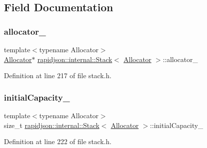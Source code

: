 \subsection{Field Documentation}
\mbox{\label{classrapidjson_1_1internal_1_1_stack_af1b187bea41f9e60e96e0a535c489ae2}} 
\subsubsection{\texorpdfstring{allocator\_}{allocator\_}}
{\footnotesize\ttfamily template$<$typename Allocator$>$ \\
\mbox{\hyperlink{classrapidjson_1_1_allocator}{Allocator}}$\ast$ \mbox{\hyperlink{classrapidjson_1_1internal_1_1_stack}{rapidjson\+::internal\+::\+Stack}}$<$ \mbox{\hyperlink{classrapidjson_1_1_allocator}{Allocator}} $>$\+::allocator\+\_\+\hspace{0.3cm}{\ttfamily [private]}}



Definition at line 217 of file stack.\+h.

\mbox{\label{classrapidjson_1_1internal_1_1_stack_a0f91a49432f4e0df57b8d28d7d75fe0f}} 
\subsubsection{\texorpdfstring{initialCapacity\_}{initialCapacity\_}}
{\footnotesize\ttfamily template$<$typename Allocator$>$ \\
size\+\_\+t \mbox{\hyperlink{classrapidjson_1_1internal_1_1_stack}{rapidjson\+::internal\+::\+Stack}}$<$ \mbox{\hyperlink{classrapidjson_1_1_allocator}{Allocator}} $>$\+::initial\+Capacity\+\_\+\hspace{0.3cm}{\ttfamily [private]}}



Definition at line 222 of file stack.\+h.

